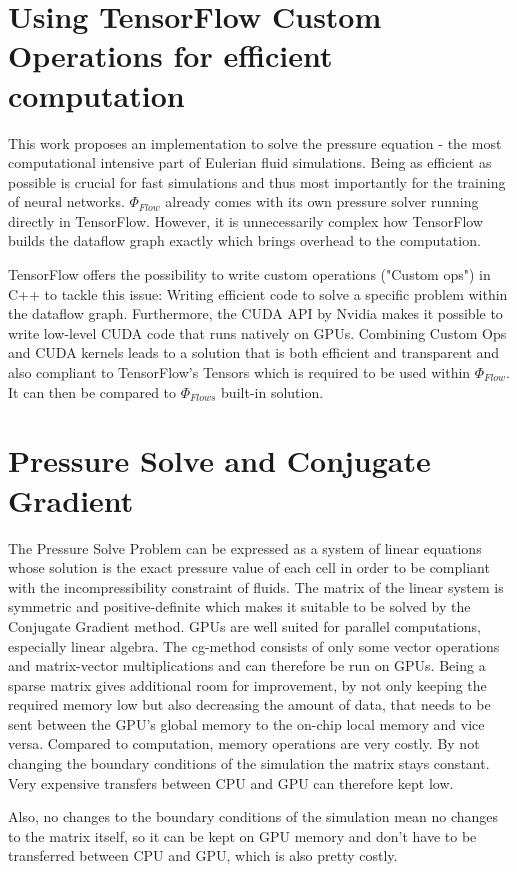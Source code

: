 \section{Using TensorFlow Custom Operations for efficient computation}
This work proposes an implementation to solve the pressure equation - the most computational intensive part of Eulerian fluid simulations. Being as efficient as possible is crucial for fast simulations and thus most importantly for the training of neural networks. $\Phi_\textit{Flow}$ already comes with its own pressure solver running directly in TensorFlow. However, it is unnecessarily complex how TensorFlow builds the dataflow graph exactly which brings overhead to the computation.\par
TensorFlow offers the possibility to write custom operations ("Custom ops") in C++ to tackle this issue: Writing efficient code to solve a specific problem within the dataflow graph. Furthermore, the CUDA API by Nvidia makes it possible to write low-level CUDA code that runs natively on GPUs. Combining Custom Ops and CUDA kernels leads to a solution that is both efficient and transparent and also compliant to TensorFlow's Tensors which is required to be used within $\Phi_\textit{Flow}$. It can then be compared to $\Phi_\textit{Flows}$ built-in solution.
\section{Pressure Solve and Conjugate Gradient}
The Pressure Solve Problem can be expressed as a system of linear equations whose solution is the exact pressure value of each cell in order to be compliant with the incompressibility constraint of fluids. The matrix of the linear system is symmetric and positive-definite which makes it suitable to be solved by the Conjugate Gradient method. GPUs are well suited for parallel computations, especially linear algebra. The cg-method consists of only some vector operations and matrix-vector multiplications and can therefore be run on GPUs. Being a sparse matrix gives additional room for improvement, by not only keeping the required memory low but also decreasing the amount of data, that needs to be sent between the GPU's global memory to the on-chip local memory and vice versa. Compared to computation, memory operations are very costly. By not changing the boundary conditions of the simulation the matrix stays constant. Very expensive transfers between CPU and GPU can therefore kept low.

Also, no changes to the boundary conditions of the simulation mean no changes to the matrix itself, so it can be kept on GPU memory and don't have to be transferred between CPU and GPU, which is also pretty costly. 